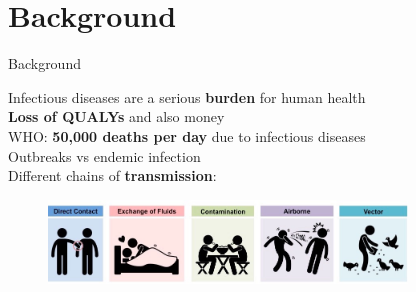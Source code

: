 \documentclass[table,notes]{beamer}\usepackage[]{graphicx}\usepackage[]{color}
\begin{document}
\section{Background}
\begin{frame}[fragile]{Background}

Infectious diseases are a serious \textbf{burden} for human health \\
\vspace{0.3cm}
\textbf{Loss of QUALYs} and also money \\ %
\vspace{0.3cm}
WHO: \textbf{50,000 deaths per day} due to infectious diseases \\ %
\vspace{0.3cm}
Outbreaks vs endemic infection \\ %
\vspace{0.3cm}
Different chains of \textbf{transmission}:
\begin{figure}
  \flushleft
  \includegraphics[width=0.85\textwidth,keepaspectratio]{disease-transmission_med.jpeg}
\end{figure}

\end{frame}
\end{document}
